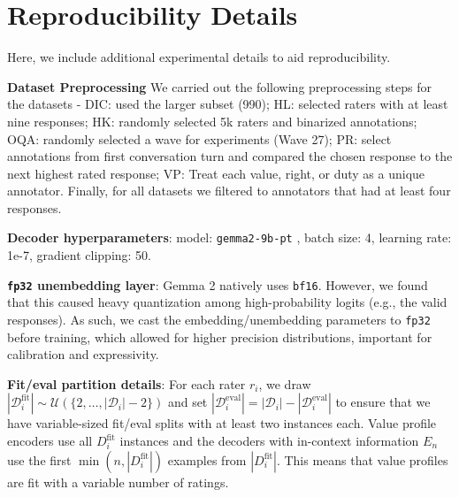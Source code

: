 \documentclass[11pt]{article}
\begin{document}
\section{Reproducibility Details}
\label{sec:reproducibility}


Here, we include additional experimental details to aid reproducibility.

\textbf{Dataset Preprocessing}
We carried out the following preprocessing steps for the datasets -
DIC: used the larger subset (990);
HL: selected raters with at least nine responses;
HK: randomly selected 5k raters and binarized annotations;
OQA: randomly selected a wave for experiments (Wave 27);
PR: select annotations from first conversation turn and compared the chosen response to the next highest rated response;
VP: Treat each value, right, or duty as a unique annotator.
Finally, for all datasets we filtered to annotators that had at least four responses.

\textbf{Decoder hyperparameters}: model: \texttt{gemma2-9b-pt} \citep{gemmateam2024gemma2improvingopen}, batch size: 4, learning rate: 1e-7, gradient clipping: 50.

\textbf{\texttt{fp32} unembedding layer}:
Gemma 2 \citep{gemmateam2024gemma2improvingopen} natively uses \texttt{bf16}. However, we found that this caused heavy quantization among high-probability logits (e.g., the valid responses). As such, we cast the embedding/unembedding parameters to \texttt{fp32} before training, which allowed for higher precision distributions, important for calibration and expressivity.

\textbf{Fit/eval partition details}: For each rater $r_i$, 
we draw $|\mathcal{D}_i^{\text{fit}}| \sim \mathcal{U}(\{2,\ldots,|\mathcal{D}_i|-2\})$ and set $|\mathcal{D}_i^\text{eval}| = |\mathcal{D}_i| - |\mathcal{D}_i^\text{eval}|$ to ensure that  we have variable-sized fit/eval splits with at least two instances each. Value profile encoders use all $D_i^\text{fit}$ instances and the decoders with in-context information $E_n$ use the first $\min(n, |D_i^\text{fit}|)$ examples from $|D_i^\text{fit}|$. This means that value profiles are fit with a variable number of ratings.
\end{document}
